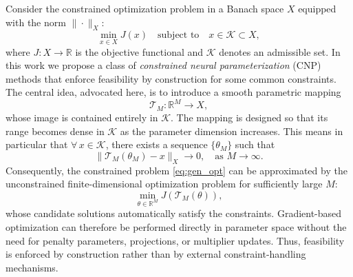\documentclass{article}
\numberwithin{equation}{section}
\begin{document}
Consider the constrained optimization problem in a Banach space $X$ equipped with the norm $\|\cdot\|_X$:
\begin{equation}\label{eq:gen_opt}
\min_{x\in X} J(x) 
\quad \text{subject to} \quad 
x\in\mathcal K\subset X,
\end{equation}
where $J:X\to\mathbb{R}$ is the objective functional and $\mathcal K$ denotes an admissible set. In this work we propose a class of \emph{constrained neural parameterization} (CNP) methods that enforce feasibility by construction for some common constraints. The central idea, advocated here, is to introduce a smooth parametric mapping
\begin{equation}
    \mathcal T_M:\mathbb R^M\to X,
\end{equation}
whose image is contained entirely in $\mathcal K$. The mapping is designed so that its range becomes dense in $\mathcal K$ as the parameter dimension increases. This means in particular that $\forall\,x\in \mathcal{K}$, there exists a sequence $\{\theta_M\}$ such that
\begin{equation}
 \|\mathcal{T}_M(\theta_M)-x\|_X\rightarrow0,\quad\text{as }M\rightarrow \infty.
\end{equation}
Consequently, the constrained problem \eqref{eq:gen_opt} can be approximated by the unconstrained finite-dimensional optimization problem for sufficiently large $M$:
\begin{equation}\label{eq:unconstrained}
\min_{\theta\in\mathbb R^M} J(\mathcal T_M(\theta)),
\end{equation}
whose candidate solutions automatically satisfy the constraints. Gradient-based optimization can therefore be performed directly in parameter space without the need for penalty parameters, projections, or multiplier updates. Thus, feasibility is enforced by construction rather than by external constraint-handling mechanisms.
\end{document}

